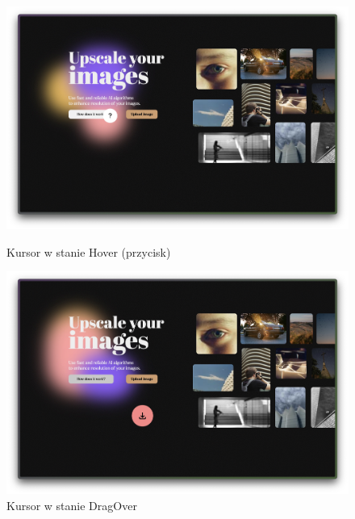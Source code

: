 \begin{figure}[ht]
    \centering
    \begin{minipage}[t]{0.47\linewidth}
        \includegraphics[width=\linewidth]{Rozdziały/06.Aplikacja/Obrazy/kursor-question.jpg}
        \caption{Kursor w stanie Hover (przycisk)}
        \label{fig:image91}
    \end{minipage}
    \hspace{0.5cm}
    \begin{minipage}[t]{0.47\linewidth}
        \includegraphics[width=\linewidth]{Rozdziały/06.Aplikacja/Obrazy/kurssor-upload.jpg}
        \caption{Kursor w stanie DragOver}
        \label{fig:image92}
    \end{minipage}
\end{figure}

